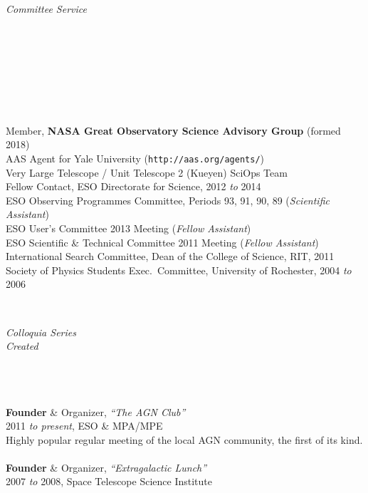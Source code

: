 \documentclass[11pt]{article}
\begin{document}
\hspace{2.5mm} \parbox{1.5in}{\textit{Committee Service\\\\\\\\\\\\\\\\}} \parbox{5.15in}{
Member, \textbf{NASA Great Observatory Science Advisory Group} (formed 2018)\\
AAS Agent for Yale University ({\small \texttt{http://aas.org/agents/}})\\
Very Large Telescope / Unit Telescope 2 (Kueyen) SciOps Team \\
Fellow Contact, ESO Directorate for Science, 2012 \textit{to} 2014 \\
ESO Observing Programmes Committee, Periods 93, 91, 90, 89 (\textit{Scientific Assistant})\\
ESO User's Committee 2013 Meeting (\textit{Fellow Assistant})\\
ESO Scientific \& Technical Committee 2011 Meeting (\textit{Fellow Assistant})\\
International Search Committee, Dean of the College of Science, RIT, 2011 \\
Society of Physics Students Exec.~Committee, University of Rochester, 2004 \textit{to} 2006}\\






\vspace{4mm}

\hspace{2.5mm} \parbox{1.5in}{\textit{Colloquia Series \\ Created\\\\\\\\} } \parbox{5.15in}{
\textbf{Founder} \& Organizer, \textit{``The AGN Club''}  \\ 2011 \textit{to present},  ESO \& MPA/MPE \\ Highly popular regular meeting of the local AGN community, the first of its kind. \\\\
\textbf{Founder} \& Organizer, \textit{``Extragalactic Lunch''} \\
2007 \textit{to} 2008, Space Telescope Science Institute} \\
\end{document}
